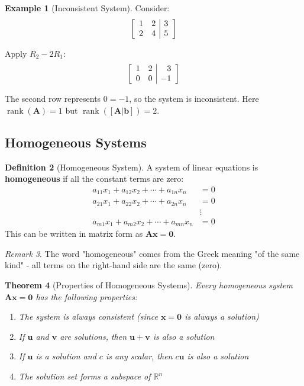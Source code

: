 \documentclass[12pt]{article}
\numberwithin{equation}{section}
\newcommand{\RR}{\mathbb{R}}
\newcommand{\vect}[1]{\boldsymbol{#1}}   %
\newcommand{\mat}[1]{\mathbf{#1}}        %
\newcommand{\rank}{\operatorname{rank}}
\newenvironment{amatrix}[1]{%
  \left[\begin{array}{#1}}
  {\end{array}\right]}
\theoremstyle{plain}
\newtheorem{theorem}{Theorem}[section]
\theoremstyle{definition}
\newtheorem{definition}[theorem]{Definition}
\newtheorem{example}[theorem]{Example}
\theoremstyle{remark}
\newtheorem{remark}[theorem]{Remark}
\begin{document}
\begin{example}[Inconsistent System]
Consider:
$$\begin{amatrix}{rr|r}
1 & 2 & 3\\
2 & 4 & 5
\end{amatrix}$$

Apply $R_2 - 2R_1$:
$$\begin{amatrix}{rr|r}
1 & 2 & 3\\
0 & 0 & -1
\end{amatrix}$$

The second row represents $0 = -1$, so the system is inconsistent.
Here $\rank(\mat{A}) = 1$ but $\rank([\mat{A}|\vect{b}]) = 2$.
\end{example}

\subsection{Homogeneous Systems}

\begin{definition}[Homogeneous System]
A system of linear equations is \textbf{homogeneous} if all the constant terms are zero:
\begin{align}
a_{11}x_1 + a_{12}x_2 + \cdots + a_{1n}x_n &= 0\\
a_{21}x_1 + a_{22}x_2 + \cdots + a_{2n}x_n &= 0\\
&\vdots\\
a_{m1}x_1 + a_{m2}x_2 + \cdots + a_{mn}x_n &= 0
\end{align}
This can be written in matrix form as $\mat{A}\vect{x} = \vect{0}$.
\end{definition}

\begin{remark}
The word "homogeneous" comes from the Greek meaning "of the same kind" - all terms on the right-hand side are the same (zero).
\end{remark}

\begin{theorem}[Properties of Homogeneous Systems]
Every homogeneous system $\mat{A}\vect{x} = \vect{0}$ has the following properties:
\begin{enumerate}
\item The system is always consistent (since $\vect{x} = \vect{0}$ is always a solution)
\item If $\vect{u}$ and $\vect{v}$ are solutions, then $\vect{u} + \vect{v}$ is also a solution
\item If $\vect{u}$ is a solution and $c$ is any scalar, then $c\vect{u}$ is also a solution
\item The solution set forms a subspace of $\RR^n$
\end{enumerate}
\end{theorem}
\end{document}
